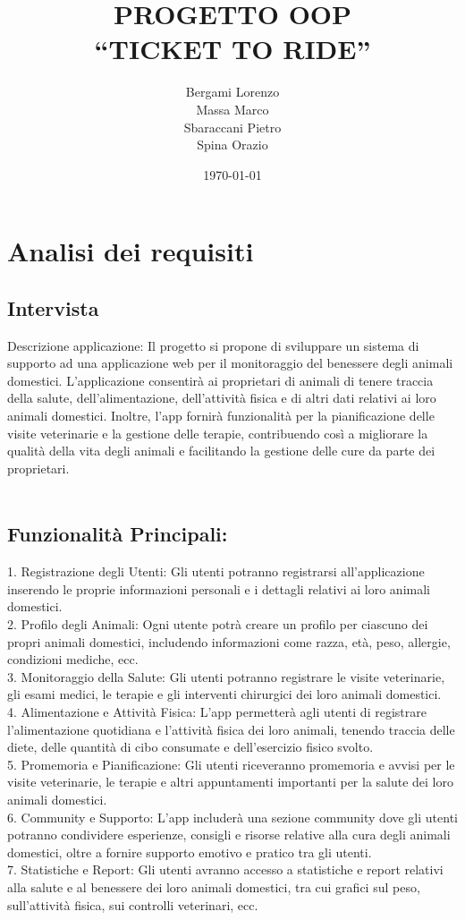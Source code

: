 \documentclass[a4paper,12pt]{report}
\title{PROGETTO OOP\\``TICKET TO RIDE''}
\author{Bergami Lorenzo\\
Massa Marco\\
Sbaraccani Pietro\\
Spina Orazio}
\date{\today}
\begin{document}
\maketitle

\tableofcontents
\chapter{Analisi dei requisiti}
\section{Intervista}
Descrizione applicazione:
Il progetto si propone di sviluppare un sistema di supporto ad una applicazione web per il monitoraggio del benessere degli animali domestici. L'applicazione consentirà ai proprietari di animali di tenere traccia della salute, dell'alimentazione, dell'attività fisica e di altri dati relativi ai loro animali domestici. Inoltre, l'app fornirà funzionalità per la pianificazione delle visite veterinarie e la gestione delle terapie, contribuendo così a migliorare la qualità della vita degli animali e facilitando la gestione delle cure da parte dei proprietari.\\\\
\section{Funzionalità Principali:\\}
1.	Registrazione degli Utenti: Gli utenti potranno registrarsi all'applicazione inserendo le proprie informazioni personali e i dettagli relativi ai loro animali domestici.\\
2.	Profilo degli Animali: Ogni utente potrà creare un profilo per ciascuno dei propri animali domestici, includendo informazioni come razza, età, peso, allergie, condizioni mediche, ecc.\\
3.	Monitoraggio della Salute: Gli utenti potranno registrare le visite veterinarie, gli esami medici, le terapie e gli interventi chirurgici dei loro animali domestici.\\
4.	Alimentazione e Attività Fisica: L'app permetterà agli utenti di registrare l'alimentazione quotidiana e l'attività fisica dei loro animali, tenendo traccia delle diete, delle quantità di cibo consumate e dell'esercizio fisico svolto.\\
5.	Promemoria e Pianificazione: Gli utenti riceveranno promemoria e avvisi per le visite veterinarie, le terapie e altri appuntamenti importanti per la salute dei loro animali domestici.\\
6.	Community e Supporto: L'app includerà una sezione community dove gli utenti potranno condividere esperienze, consigli e risorse relative alla cura degli animali domestici, oltre a fornire supporto emotivo e pratico tra gli utenti.\\
7.	Statistiche e Report: Gli utenti avranno accesso a statistiche e report relativi alla salute e al benessere dei loro animali domestici, tra cui grafici sul peso, sull'attività fisica, sui controlli veterinari, ecc.\\\\
\end{document}
